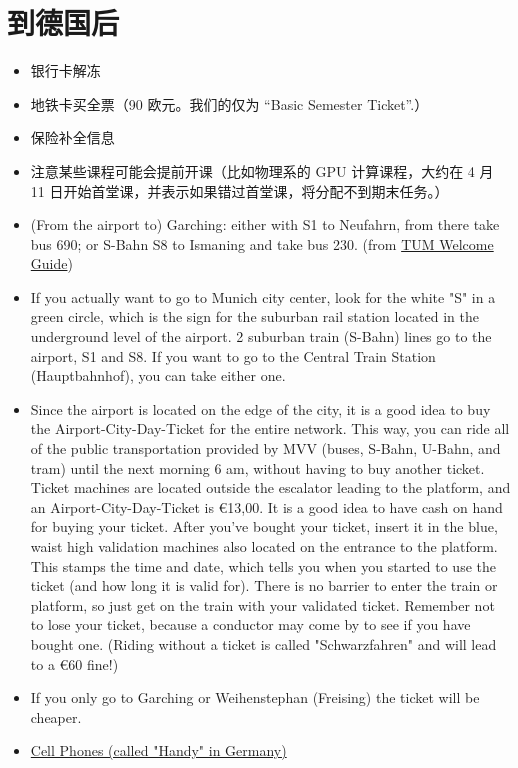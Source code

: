 \documentclass[final]{book}
\begin{document}
\chapter{到德国后}
\begin{itemize}
  \item 银行卡解冻
  \item 地铁卡买全票（90 欧元。我们的仅为 ``Basic Semester Ticket''.）
  \item 保险补全信息
  \item 注意某些课程可能会提前开课（比如物理系的 GPU 计算课程，大约在 4 月 11 日开始首堂课，并表示如果错过首堂课，将分配不到期末任务。）
  \item (From the airport to) {\color{blue}Garching}: either with S1 to Neufahrn, from there take bus 690; or S-Bahn S8 to Ismaning and take bus 230. (from \href{https://distributed-campus.org/tumwelcomeguide/portal/media-type/html/language/en/role/student/page/default.psml/js_panename/DCContentObjectAusgabe/language/en/idgroup/19/id/96/typ/text}{TUM Welcome Guide})
  \item If you actually want to go to {\color{blue}Munich city center}, look for the white "S" in a green circle, which is the sign for the suburban rail station located in the underground level of the airport. 2 suburban train (S-Bahn) lines go to the airport, {\color{blue}S1 and S8}. If you want to go to the Central Train Station (Hauptbahnhof), you can take either one.
  \item Since the airport is located on the edge of the city, it is a good idea to buy the {\color{blue}Airport-City-Day-Ticket} for the entire network. This way, you can ride all of the public transportation provided by MVV (buses, S-Bahn, U-Bahn, and tram) until the next morning 6 am, without having to buy another ticket. Ticket machines are located outside the escalator leading to the platform, and an Airport-City-Day-Ticket is \euro{13,00}. It is a good idea to have cash on hand for buying your ticket. After you've bought your ticket, insert it in the blue, waist high validation machines also located on the entrance to the platform. This stamps the time and date, which tells you when you started to use the ticket (and how long it is valid for). There is no barrier to enter the train or platform, so just get on the train with your validated ticket. Remember not to lose your ticket, because a conductor may come by to see if you have bought one. (Riding without a ticket is called "Schwarzfahren" and will lead to a \euro{60} fine!)
  \item If you only go to Garching or Weihenstephan (Freising) the ticket will be cheaper.
  \item \href{https://distributed-campus.org/tumwelcomeguide/portal/media-type/html/language/en/role/student/page/default.psml/js_panename/DCContentObjectAusgabe/language/en/idgroup/19/id/111/typ/text}{Cell Phones (called "Handy" in Germany)}
\end{itemize}
\end{document}
